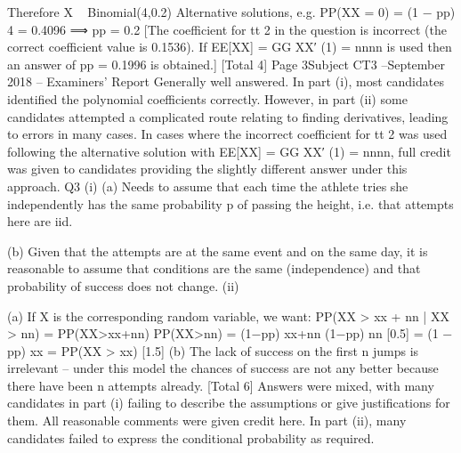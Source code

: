\documentclass[a4paper,12pt]{article}
\begin{document}
Therefore X ~ Binomial(4,0.2)
Alternative solutions, e.g. PP(XX = 0) = (1 − pp) 4 = 0.4096 ⟹ pp = 0.2
[The coefficient for tt 2 in the question is incorrect (the correct coefficient value is 0.1536). If
EE[XX] = GG XX′ (1) = nnnn is used then an answer of pp = 0.1996 is obtained.]
[Total 4]
Page 3Subject CT3  –September 2018 – Examiners’ Report
Generally well answered. In part (i), most candidates identified the
polynomial coefficients correctly. However, in part (ii) some
candidates attempted a complicated route relating to finding
derivatives, leading to errors in many cases.
In cases where the incorrect coefficient for tt 2 was used following the
alternative solution with EE[XX] = GG XX′ (1) = nnnn, full credit was given to
candidates providing the slightly different answer under this approach.
Q3
(i)
(a) Needs to assume that each time the athlete tries she independently has the same
probability p of passing the height, i.e. that attempts here are iid.

(b) Given that the attempts are at the same event and on the same day,
it is reasonable to assume that conditions are the same (independence) and that
probability of success does not change.
(ii)

(a) If X is the corresponding random variable, we want:
PP(XX > xx + nn | XX > nn)
=
PP(XX>xx+nn)
PP(XX>nn)
=
(1−pp) xx+nn
(1−pp) nn
[0.5]
= (1 − pp) xx = PP(XX > xx)
[1.5]
(b) The lack of success on the first n jumps is irrelevant – under this model the
chances of success are not any better because there have been n attempts already. 
[Total 6]
Answers were mixed, with many candidates in part (i) failing to
describe the assumptions or give justifications for them. All reasonable
comments were given credit here. In part (ii), many candidates failed to
express the conditional probability as required.
\end{document}
